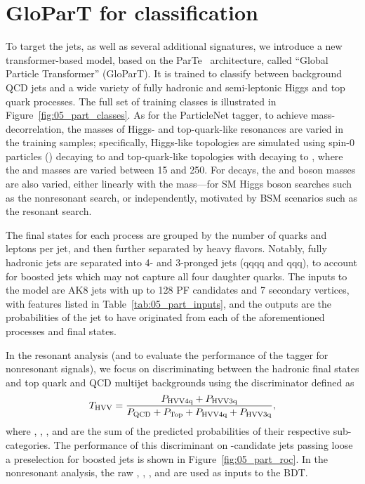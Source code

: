 \section{GloParT for \texorpdfstring{\hyvv}{H/Y→VV} classification}
\label{sec:05_hww_tagger}

To target the \hyvvq jets, as well as several additional signatures, we introduce a new transformer-based model, based on the ParTe~\cite{Qu:2022mxj} architecture, called ``Global Particle Transformer'' (GloParT).
It is trained to classify between background QCD jets and a wide variety of fully hadronic and semi-leptonic Higgs and top quark processes.
The full set of training classes is illustrated in Figure~\ref{fig:05_part_classes}.
As for the ParticleNet tagger, to achieve mass-decorrelation, the masses of Higgs- and top-quark-like resonances are varied in the training samples; specifically, Higgs-like topologies are simulated using spin-0 particles (\PG) decaying to \HH and top-quark-like topologies with \PG decaying to \ttbar, where the \PH and \PQt masses are varied between 15 and 250\GeV.
For \hvv decays, the \PW and \PZ boson masses are also varied, either linearly with the \PH mass---for SM Higgs boson searches such as the nonresonant \HH search, or independently, motivated by BSM scenarios such as the resonant \XHY search.

The final states for each process are grouped by the number of quarks and leptons per jet, and then further separated by heavy flavors.
Notably, fully hadronic \hvv jets are separated into 4- and 3-pronged jets (qqqq and qqq), to account for boosted jets which may not capture all four \VV daughter quarks.
The inputs to the model are AK8 jets with up to 128 PF candidates and 7 secondary vertices, with features listed in Table~\ref{tab:05_part_inputs}, and the outputs are the probabilities of the jet to have originated from each of the aforementioned processes and final states.

In the resonant analysis (and to evaluate the performance of the tagger for nonresonant signals), we focus on discriminating between the hadronic \hvv final states and top quark and QCD multijet backgrounds using the \THWW discriminator defined as
\begin{equation}
  \label{eq:05_thww}
  T_\mathrm{HVV} = \frac{P_\mathrm{HVV4q} + P_\mathrm{HVV3q}}{P_\mathrm{QCD} + P_\mathrm{Top} + P_\mathrm{HVV4q} + P_\mathrm{HVV3q}},
\end{equation}
where \PHWWqqqq, \PHWWqqq, \PQCD, and \PTop are the sum of the predicted probabilities of their respective sub-categories.
The performance of this discriminant on \VV-candidate jets passing loose a preselection for boosted jets is shown in Figure~\ref{fig:05_part_roc}.
In the nonresonant analysis, the raw \PHWWqqqq, \PHWWqqq, \PQCD, and \PTop are used as inputs to the BDT.

